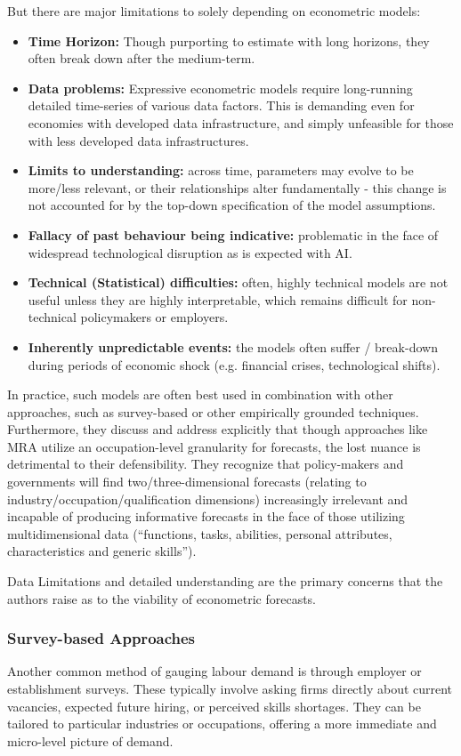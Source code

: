 But there are major limitations to solely depending on econometric models:
\begin{itemize}
  \item \textbf{Time Horizon:} Though purporting to estimate with long horizons, they often break down after the medium-term.
  \item \textbf{Data problems:} Expressive econometric models require long-running detailed time-series of various data factors. This is demanding even for economies with developed data infrastructure, and simply unfeasible for those with less developed data infrastructures.
  \item \textbf{Limits to understanding:} across time, parameters may evolve to be more/less relevant, or their relationships alter fundamentally - this change is not accounted for by the top-down specification of the model assumptions.
  \item \textbf{Fallacy of past behaviour being indicative:} problematic in the face of widespread technological disruption as is expected with AI.
  \item \textbf{Technical (Statistical) difficulties:} often, highly technical models are not useful unless they are highly interpretable, which remains difficult for non-technical policymakers or employers.
  \item \textbf{Inherently unpredictable events:} the models often suffer / break-down during periods of economic shock (e.g. financial crises, technological shifts).
\end{itemize}

In practice, such models are often best used in combination with other approaches, such as survey-based or other empirically grounded techniques.
Furthermore, they discuss and address explicitly that though approaches like MRA utilize an occupation-level granularity for forecasts,
the lost nuance is detrimental to their defensibility. They recognize that policy-makers and governments will find two/three-dimensional forecasts (relating to industry/occupation/qualification dimensions)
increasingly irrelevant and incapable of producing informative forecasts in the face of those utilizing multidimensional data (``functions, tasks, abilities, personal attributes, characteristics and generic skills'').

Data Limitations and detailed understanding are the primary concerns that the authors raise as to the viability of econometric forecasts.

\subsubsection{Survey-based Approaches~\cite{OECD_GettingSkillsRight}}
Another common method of gauging labour demand is through employer or establishment surveys.
These typically involve asking firms directly about current vacancies, expected future hiring, or perceived skills shortages.
They can be tailored to particular industries or occupations, offering a more immediate and micro-level picture of demand.

